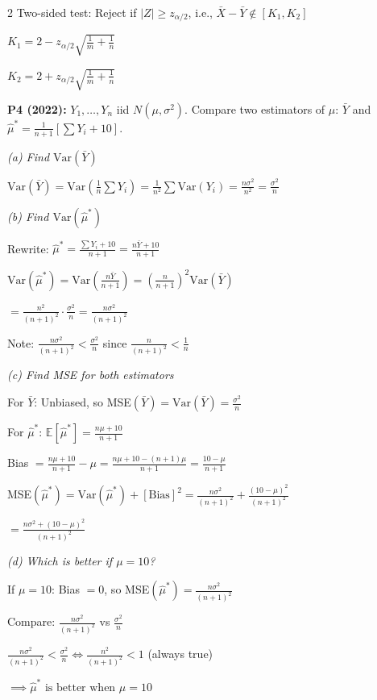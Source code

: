 \documentclass[10pt,letterpaper]{article}
\newcommand{\Var}{\text{Var}}
\newcommand{\E}{\mathbb{E}}
\begin{document}
\begin{multicols}{2}
Two-sided test: Reject if $|Z| \ge z_{\alpha/2}$, i.e., $\bar{X}-\bar{Y} \notin [K_1, K_2]$

$\boxed{K_1 = 2 - z_{\alpha/2}\sqrt{\frac{1}{m}+\frac{1}{n}}}$

$\boxed{K_2 = 2 + z_{\alpha/2}\sqrt{\frac{1}{m}+\frac{1}{n}}}$



\textbf{P4 (2022):} $Y_1, \ldots, Y_n$ iid $N(\mu, \sigma^2)$. Compare two estimators of $\mu$: $\bar{Y}$ and $\hat{\mu}^* = \frac{1}{n+1}[\sum Y_i + 10]$.

\textit{(a) Find $\Var(\bar{Y})$}

$\Var(\bar{Y}) = \Var\left(\frac{1}{n}\sum Y_i\right) = \frac{1}{n^2}\sum \Var(Y_i) = \frac{n\sigma^2}{n^2} = \boxed{\frac{\sigma^2}{n}}$

\textit{(b) Find $\Var(\hat{\mu}^*)$}

Rewrite: $\hat{\mu}^* = \frac{\sum Y_i + 10}{n+1} = \frac{n\bar{Y} + 10}{n+1}$

$\Var(\hat{\mu}^*) = \Var\left(\frac{n\bar{Y}}{n+1}\right) = \left(\frac{n}{n+1}\right)^2 \Var(\bar{Y})$

$= \frac{n^2}{(n+1)^2} \cdot \frac{\sigma^2}{n} = \boxed{\frac{n\sigma^2}{(n+1)^2}}$

Note: $\frac{n\sigma^2}{(n+1)^2} < \frac{\sigma^2}{n}$ since $\frac{n}{(n+1)^2} < \frac{1}{n}$

\textit{(c) Find MSE for both estimators}

For $\bar{Y}$: Unbiased, so MSE$(\bar{Y}) = \Var(\bar{Y}) = \frac{\sigma^2}{n}$

For $\hat{\mu}^*$: $\E[\hat{\mu}^*] = \frac{n\mu + 10}{n+1}$

Bias $= \frac{n\mu + 10}{n+1} - \mu = \frac{n\mu + 10 - (n+1)\mu}{n+1} = \frac{10-\mu}{n+1}$

MSE$(\hat{\mu}^*) = \Var(\hat{\mu}^*) + [\text{Bias}]^2 = \frac{n\sigma^2}{(n+1)^2} + \frac{(10-\mu)^2}{(n+1)^2}$

$= \boxed{\frac{n\sigma^2 + (10-\mu)^2}{(n+1)^2}}$

\textit{(d) Which is better if $\mu=10$?}

If $\mu=10$: Bias $= 0$, so MSE$(\hat{\mu}^*) = \frac{n\sigma^2}{(n+1)^2}$

Compare: $\frac{n\sigma^2}{(n+1)^2}$ vs $\frac{\sigma^2}{n}$

$\frac{n\sigma^2}{(n+1)^2} < \frac{\sigma^2}{n} \iff \frac{n^2}{(n+1)^2} < 1$ (always true)

$\implies \boxed{\hat{\mu}^* \text{ is better when } \mu=10}$


\end{multicols}
\end{document}
